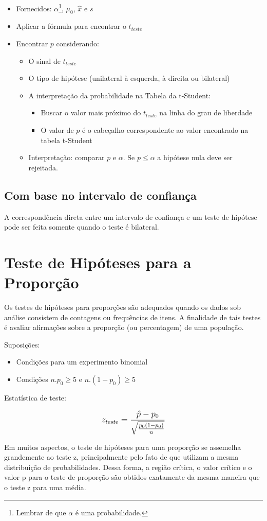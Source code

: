 \begin{itemize}
	\item Fornecidos: \(\alpha\)\footnote{Lembrar de que \(\alpha\) é uma probabilidade.}, \(\mu_0\), \(\hat{x}\) e \(s\)
	\item Aplicar a fórmula para encontrar o \(t_{teste}\)
	\item Encontrar \(p\) considerando:
	\begin{itemize}
		\item O sinal de \(t_{teste}\)
		\item O tipo de hipótese (unilateral à esquerda, à direita ou bilateral)
		\item A interpretação da probabilidade na Tabela da t-Student:
			\begin{itemize}
				\item Buscar o valor mais próximo do \(t_{teste}\) na linha do grau de liberdade
				\item O valor de \(p\) é o cabeçalho correspondente ao valor encontrado na tabela t-Student
			\end{itemize}
		\item Interpretação: comparar \(p\) e \(\alpha\). Se \(p \leq \alpha\) a hipótese nula deve ser rejeitada.
	\end{itemize}
\end{itemize}

\subsection{Com base no intervalo de confiança}

A correspondência direta entre um intervalo de confiança e um teste de hipótese pode ser feita somente quando o teste é bilateral.

\section{Teste de Hipóteses para a Proporção}

Os testes de hipóteses para proporções são adequados quando os dados sob análise consistem de contagens ou frequências de itens. A finalidade de tais testes é avaliar afirmações sobre a proporção (ou percentagem) de uma população.

Suposições:
\begin{itemize}
	\item Condições para um experimento binomial
	\item Condições \(n.p_0\geq5\) e \(n.(1-p_0)\geq5\)
\end{itemize}

Estatística de teste:

 \[\beq{ z_{teste} = \frac{\hat{p}-p_0}{\sqrt{\frac{p_0(1-p_0)}{n}}} }\]
 
Em muitos aspectos, o teste de hipóteses para uma proporção se assemelha grandemente ao teste z, principalmente pelo fato de que utilizam a mesma distribuição de probabilidades. Dessa forma, a região crítica, o valor crítico e o valor p para o teste de proporção são obtidos exatamente da mesma maneira que o teste z para uma média.

